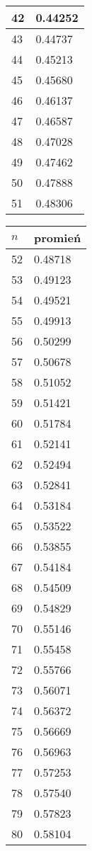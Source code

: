 \documentclass{article}
\begin{document}
\begin{table}[H]
\begin{tabular}{|l|l|}
42 & 0.44252 \\ \hline
43 & 0.44737 \\ \hline
44 & 0.45213 \\ \hline
45 & 0.45680 \\ \hline
46 & 0.46137 \\ \hline
47 & 0.46587 \\ \hline
48 & 0.47028 \\ \hline
49 & 0.47462 \\ \hline
50 & 0.47888 \\ \hline
51 & 0.48306 \\ \hline
\end{tabular}
\begin{tabular}{|l|l|}
\hline
$n$ & promień \\ \hline
52 & 0.48718 \\ \hline
53 & 0.49123 \\ \hline
54 & 0.49521 \\ \hline
55 & 0.49913 \\ \hline
56 & 0.50299 \\ \hline
57 & 0.50678 \\ \hline
58 & 0.51052 \\ \hline
59 & 0.51421 \\ \hline
60 & 0.51784 \\ \hline
61 & 0.52141 \\ \hline
62 & 0.52494 \\ \hline
63 & 0.52841 \\ \hline
64 & 0.53184 \\ \hline
65 & 0.53522 \\ \hline
66 & 0.53855 \\ \hline
67 & 0.54184 \\ \hline
68 & 0.54509 \\ \hline
69 & 0.54829 \\ \hline
70 & 0.55146 \\ \hline
71 & 0.55458 \\ \hline
72 & 0.55766 \\ \hline
73 & 0.56071 \\ \hline
74 & 0.56372 \\ \hline
75 & 0.56669 \\ \hline
76 & 0.56963 \\ \hline
77 & 0.57253 \\ \hline
78 & 0.57540 \\ \hline
79 & 0.57823 \\ \hline
80 & 0.58104 \\ \hline

\end{tabular}
\end{table}
\end{document}
